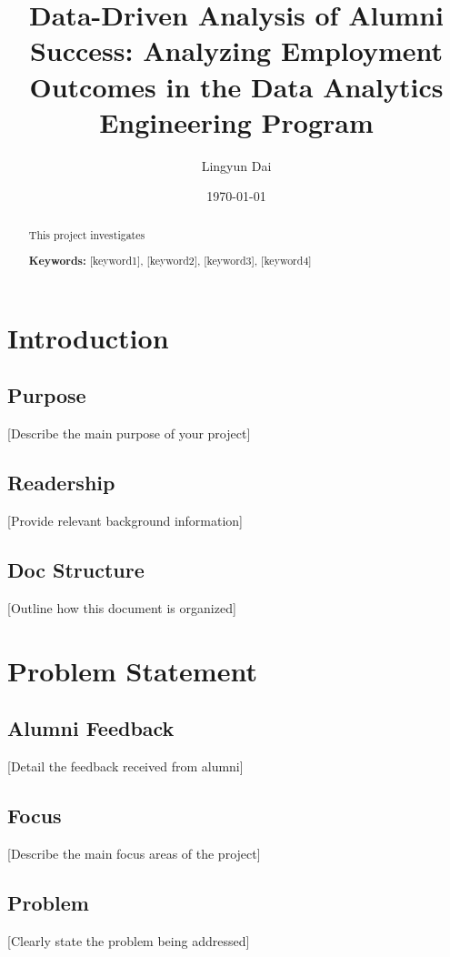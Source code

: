 \documentclass[12pt,a4paper]{article}
\title{\textbf{Data-Driven Analysis of Alumni Success: Analyzing Employment Outcomes in the Data Analytics Engineering Program}}
\author{Lingyun Dai}
\date{\today}
\begin{document}
\maketitle

\begin{abstract}
This project investigates 

\textbf{Keywords:} [keyword1], [keyword2], [keyword3], [keyword4]
\end{abstract}

\newpage
\tableofcontents
\newpage

\section{Introduction}
\subsection{Purpose}
[Describe the main purpose of your project]

\subsection{Readership}
[Provide relevant background information]

\subsection{Doc Structure}
[Outline how this document is organized]

\section{Problem Statement}
\subsection{Alumni Feedback}
[Detail the feedback received from alumni]

\subsection{Focus}
[Describe the main focus areas of the project]

\subsection{Problem}
[Clearly state the problem being addressed]
\end{document}
